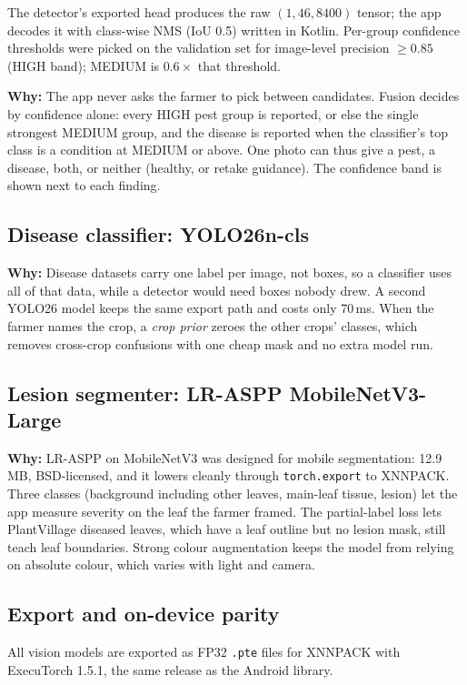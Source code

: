\documentclass[11pt,a4paper]{article}
\newcommand{\why}[1]{\par\smallskip\noindent\colorbox{leaflight}{\parbox{\dimexpr\linewidth-2\fboxsep}{\small\textbf{\color{leaf}Why:} #1}}\par\smallskip}
\begin{document}
The detector's exported head produces the raw $(1, 46, 8400)$ tensor; the app decodes it with class-wise NMS (IoU 0.5)
written in Kotlin. Per-group confidence thresholds were picked on the validation set for image-level precision
$\geq 0.85$ (HIGH band); MEDIUM is $0.6\times$ that threshold.

\why{The app never asks the farmer to pick between candidates. Fusion decides by confidence alone: every HIGH pest group
is reported, or else the single strongest MEDIUM group, and the disease is reported when the classifier's top class is
a condition at MEDIUM or above. One photo can thus give a pest, a disease, both, or neither (healthy, or retake
guidance). The confidence band is shown next to each finding.}

\subsection{Disease classifier: YOLO26n-cls}
\why{Disease datasets carry one label per image, not boxes, so a classifier uses all of that data, while a detector
would need boxes nobody drew. A second YOLO26 model keeps the same export path and costs only 70\,ms. When the farmer
names the crop, a \emph{crop prior} zeroes the other crops' classes, which removes cross-crop confusions with one cheap mask and no extra model run.}

\subsection{Lesion segmenter: LR-ASPP MobileNetV3-Large}
\why{LR-ASPP on MobileNetV3 was designed for mobile segmentation: 12.9\,MB, BSD-licensed, and it lowers cleanly through
\texttt{torch.export} to XNNPACK. Three classes (background including other leaves, main-leaf tissue, lesion) let the
app measure severity on the leaf the farmer framed. The partial-label loss lets PlantVillage diseased leaves, which
have a leaf outline but no lesion mask, still teach leaf boundaries. Strong colour augmentation keeps the model from
relying on absolute colour, which varies with light and camera.}

\subsection{Export and on-device parity}
All vision models are exported as FP32 \texttt{.pte} files for XNNPACK with ExecuTorch 1.5.1, the same release as the
Android library.
\end{document}
